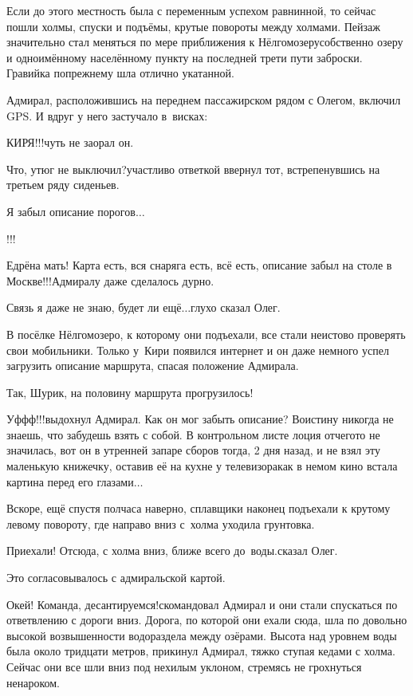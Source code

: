 Если до этого местность была с переменным успехом равнинной, то сейчас пошли холмы, спуски и подъёмы, крутые повороты между холмами. Пейзаж значительно стал меняться по мере приближения к Нёлгомозеру\mdash собственно озеру и одноимённому населённому пункту на последней трети пути заброски. Гравийка по\sdash прежнему шла отлично укатанной.

Адмирал, расположившись на переднем пассажирском рядом с Олегом, включил GPS. И вдруг у него застучало в~висках:

\diagdash КИРЯ!!!\mdash чуть не заорал он.

\diagdash Что, утюг не выключил?\mdash участливо ответкой ввернул тот, встрепенувшись на третьем ряду сиденьев.

\diagdash Я забыл описание порогов$\ldots$

\diagdash !!!

\diagdash Едрёна мать! Карта есть, вся снаряга есть, всё есть, описание забыл на столе в Москве!!!\mdash Адмиралу даже сделалось дурно.

\diagdash Связь я даже не знаю, будет ли ещё$\ldots$\mdash глухо сказал Олег.

В посёлке Нёлгомозеро, к которому они подъехали, все стали неистово проверять свои мобильники. Только у~Кири появился интернет и он даже немного успел загрузить описание маршрута, спасая положение Адмирала.

\diagdash Так, Шурик, на половину маршрута прогрузилось!

\diagdash Уф\sdash ф\sdash ф!!!\mdash выдохнул Адмирал. Как он мог забыть описание? Воистину никогда не знаешь, что забудешь взять с собой. В контрольном листе лоция отчего\sdash то не значилась, вот он в утренней запаре сборов тогда, 2 дня назад, и не взял эту маленькую книжечку, оставив её на кухне у телевизора\mdash как в немом кино встала картина перед его глазами$\ldots$

Вскоре, ещё спустя полчаса наверно, сплавщики наконец подъехали к крутому левому повороту, где направо вниз с~холма уходила грунтовка. 

\diagdash Приехали! Отсюда, с холма вниз, ближе всего до~воды.\mdash сказал Олег.

Это согласовывалось с адмиральской картой. 

\diagdash Окей! Команда, десантируемся!\mdash скомандовал Адмирал и они стали спускаться по ответвлению с дороги вниз. Дорога, по которой они ехали сюда, шла по довольно высокой возвышенности водораздела между озёрами. Высота над уровнем воды была около тридцати метров, прикинул Адмирал, тяжко ступая кедами с холма. Сейчас они все шли вниз под нехилым уклоном, стремясь не грохнуться ненароком.

